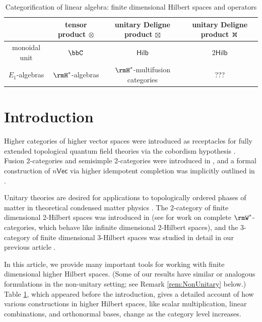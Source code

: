 \documentclass[12pt, reqno]{amsart}
\newcommand{\Vect}{\mathsf{Vec}}
\newcommand{\Hilb}{\mathsf{Hilb}}
\theoremstyle{plain}
\theoremstyle{definition}
\newcommand{\dtimesaux}[4]{\mathbin{\vcenter{\hbox{\raisebox{#4}{\scalebox{#3}{\ooalign{\hfil$\vcenter{\hbox{$#1\times$}}$\hfil\cr\hfil$\vcenter{\hbox{\mbox{#2\upshape\wasylozenge}}}$\hfil\cr}}}}}}}
\newcommand{\dtimes}{%
  \mathchoice
    {\dtimesaux{\displaystyle}{\normalsize}{1.15}{0.35ex}}
    {\dtimesaux{\textstyle}{\normalsize}{1.15}{0.35ex}}
    {\dtimesaux{\scriptstyle}{\scriptsize}{1.0}{0ex}}
    {\dtimesaux{\scriptscriptstyle}{\tiny}{1.0}{0ex}}%
}
\newcommand{\threehilbtimes}{\dtimes}
\begin{document}
\begin{landscape}
\begin{table}
\begin{tabular}{|c||c|c|c|}
&
tensor product $\otimes$
&
unitary Deligne product $\boxtimes$
&
unitary Deligne product $\threehilbtimes$
\\\hline
monoidal unit
&
$\bbC$
&
$\Hilb$
&
$2\Hilb$
\\\hline
$E_1$-algebras
&
$\rmH^*$-algebras
&
$\rmH^*$-multifusion categories
&
???
\\\hline
\end{tabular}
\vspace*{1cm}
\caption{\label{fig:Categorify}Categorification of linear algebra: finite dimensional Hilbert spaces and operators}
\end{table}
\end{landscape}


\newpage
\section{Introduction}

Higher categories of higher vector spaces were introduced as receptacles for fully extended topological quantum field theories via the cobordism hypothesis \cite{MR1355899}.
Fusion 2-categories and semisimple 2-categories were introduced in \cite{1812.11933}, and a formal construction of $n\Vect$ via higher idempotent completion was implicitly outlined in \cite{1905.09566}.

Unitary theories are desired for applications to topologically ordered phases of matter in theoretical condensed matter physics \cite{MR1951039,cond-mat/0506438,PhysRevB.71.045110,MR1910833,NaaijkensThesis,MR4268163,MR4362722,MR4444089,MR4945955}.
The 2-category of finite dimensional 2-Hilbert spaces was introduced in \cite{MR1448713} (see \cite{2411.01678} for work on complete $\rmW^*$-categories, which behave like infinite dimensional 2-Hilbert spaces), and the 3-category of finite dimensional 3-Hilbert spaces was studied in detail in our previous article \cite{MR5078555}. 

In this article, we provide many important tools for working with finite dimensional higher Hilbert spaces.
(Some of our results have similar or analogous formulations in the non-unitary setting; see Remark \ref{rem:NonUnitary} below.)
Table \ref{fig:Categorify}, which appeared before the introduction, gives a detailed account of how various constructions in higher Hilbert spaces, like scalar multiplication, linear combinations, and orthonormal bases, change as the category level increases. 
\end{document}
